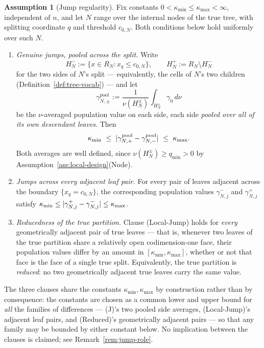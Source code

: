 \documentclass[11pt]{article}
\theoremstyle{plain}
\theoremstyle{definition}
\newtheorem{assumption}{Assumption}
\theoremstyle{remark}
\DeclarePairedDelimiter{\abs}{\lvert}{\rvert}
\begin{document}
\begin{assumption}[Jump regularity]\label{ass:jump-regularity}
Fix constants \(0<\kappa_{\min}\le\kappa_{\max}<\infty\), independent of
\(n\), and let \(N\) range over the internal nodes of the true tree, with
splitting coordinate \(q\) and threshold \(c_{0,N}\). Both conditions below
hold uniformly over such \(N\).
\begin{enumerate}[leftmargin=*]
  \item[(J)] \emph{Genuine jumps, pooled across the split.}
  Write
  \[
    H^-_N:=\{x\in R_N:x_q\le c_{0,N}\},
    \qquad
    H^+_N:=R_N\setminus H^-_N
  \]
  for the two sides of \(N\)'s split --- equivalently, the cells of \(N\)'s
  two children (Definition~\ref{def:tree-vocab}) --- and let
  \[
    \gamma^{\mathrm{pool}}_{N,\pm}
    :=
    \frac1{\nu(H^\pm_N)}\int_{H^\pm_N}\gamma_0\,d\nu
  \]
  be the \(\nu\)-averaged population value on each side, each side
  \emph{pooled over all of its own descendant leaves}. Then
  \[
    \kappa_{\min}
    \ \le\
    \abs{\gamma^{\mathrm{pool}}_{N,+}-\gamma^{\mathrm{pool}}_{N,-}}
    \ \le\ \kappa_{\max}.
  \]
  Both averages are well defined, since \(\nu(H^\pm_N)\ge q_{\min}>0\) by
  Assumption~\ref{ass:local-design}(Node).

  \item[(Local-Jump)] \emph{Jumps across every adjacent leaf pair.}
  For every pair of leaves adjacent across the boundary \(\{x_q=c_{0,N}\}\),
  the corresponding population values \(\gamma^-_{N,j}\) and
  \(\gamma^+_{N,j}\) satisfy
  \(\kappa_{\min}\le\abs{\gamma^+_{N,j}-\gamma^-_{N,j}}\le\kappa_{\max}\).

  \item[(Reduced)] \emph{Reducedness of the true partition.}
  Clause (Local-Jump) holds for \emph{every} geometrically adjacent pair of
  true leaves --- that is, whenever two leaves of the true partition share a
  relatively open codimension-one face, their population values differ by an
  amount in \([\kappa_{\min},\kappa_{\max}]\), whether or not that face is
  the face of a single true split. Equivalently, the true partition is
  \emph{reduced}: no two geometrically adjacent true leaves carry the same
  value.
\end{enumerate}
The three clauses share the constants \(\kappa_{\min},\kappa_{\max}\) by
construction rather than by consequence: the constants are chosen as a common
lower and upper bound for \emph{all} the families of differences ---
(J)'s two pooled side averages, (Local-Jump)'s adjacent leaf pairs, and
(Reduced)'s geometrically adjacent pairs --- so that any family may be bounded
by either constant below. No implication between the clauses is claimed; see
Remark~\ref{rem:jump-role}.
\end{assumption}
\end{document}
